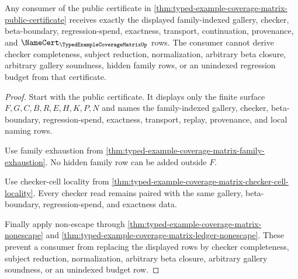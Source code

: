 \begin{corollary}
\label{cor:typed-example-coverage-matrix-consumer-exactness}
Any consumer of the public certificate in \autoref{thm:typed-example-coverage-matrix-public-certificate} receives exactly the displayed family-indexed gallery, checker, beta-boundary, regression-spend, exactness, transport, continuation, provenance, and $\NameCert_{\TypedExampleCoverageMatrixUp}$ rows. The consumer cannot derive checker completeness, subject reduction, normalization, arbitrary beta closure, arbitrary gallery soundness, hidden family rows, or an unindexed regression budget from that certificate.
\end{corollary}
\begin{proof}
Start with the public certificate. It displays only the finite surface $F,G,C,B,R,E,H,K,P,N$ and names the family-indexed gallery, checker, beta-boundary, regression-spend, exactness, transport, replay, provenance, and local naming rows.

Use family exhaustion from \autoref{thm:typed-example-coverage-matrix-family-exhaustion}. No hidden family row can be added outside $F$.

Use checker-cell locality from \autoref{thm:typed-example-coverage-matrix-checker-cell-locality}. Every checker read remains paired with the same gallery, beta-boundary, regression-spend, and exactness data.

Finally apply non-escape through \autoref{thm:typed-example-coverage-matrix-nonescape} and \autoref{thm:typed-example-coverage-matrix-ledger-nonescape}. These prevent a consumer from replacing the displayed rows by checker completeness, subject reduction, normalization, arbitrary beta closure, arbitrary gallery soundness, or an unindexed budget row.
\end{proof}

